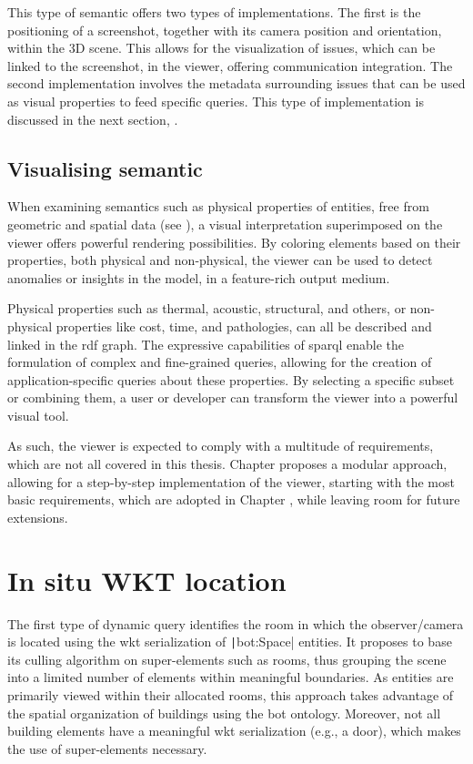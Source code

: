 This type of semantic offers two types of implementations. The first is the positioning of a screenshot, together with its camera position and orientation, within the 3D scene. This allows for the visualization of issues, which can be linked to the screenshot, in the viewer, offering communication integration. The second implementation involves the metadata surrounding issues that can be used as visual properties to feed specific queries. This type of implementation is discussed in the next section, .

\subsection{Visualising semantic} \label{sec:visualSemantic}
When examining semantics such as physical properties of entities, free from geometric and spatial data (see ), a visual interpretation superimposed on the viewer offers powerful rendering possibilities. By coloring elements based on their properties, both physical and non-physical, the viewer can be used to detect anomalies or insights in the model, in a feature-rich output medium.

Physical properties such as thermal, acoustic, structural, and others, or non-physical properties like cost, time, and pathologies, can all be described and linked in the \ac{rdf} graph. The expressive capabilities of \ac{sparql} enable the formulation of complex and fine-grained queries, allowing for the creation of application-specific queries about these properties. By selecting a specific subset or combining them, a user or developer can transform the viewer into a powerful visual tool.

As such, the viewer is expected to comply with a multitude of requirements, which are not all covered in this thesis. Chapter  proposes a modular approach, allowing for a step-by-step implementation of the viewer, starting with the most basic requirements, which are adopted in Chapter , while leaving room for future extensions.

\section{In situ WKT location} \label{sec:inSituWKT}
The first type of dynamic query identifies the room in which the observer/camera is located using the \ac{wkt} serialization of \texttt|bot:Space| entities. It proposes to base its culling algorithm on super-elements such as rooms, thus grouping the scene into a limited number of elements within meaningful boundaries. As entities are primarily viewed within their allocated rooms, this approach takes advantage of the spatial organization of buildings using the \ac{bot} ontology. Moreover, not all building elements have a meaningful \ac{wkt} serialization (e.g., a door), which makes the use of super-elements necessary.

